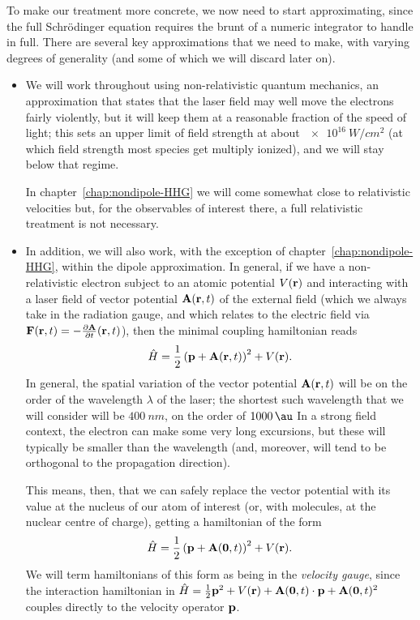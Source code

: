 To make our treatment more concrete, we now need to start approximating, since the full Schrödinger equation requires the brunt of a numeric integrator to handle in full. There are several key approximations that we need to make, with varying degrees of generality (and some of which we will discard later on).

\begin{itemize}
\item We will work throughout using non-relativistic quantum mechanics, an approximation that states that the laser field may well move the electrons fairly violently, but it will keep them at a reasonable fraction of the speed of light; this sets an upper limit of field strength at about $\SI{e16}{W/cm^2}$ (at which field strength most species get multiply ionized), and we will stay below that regime. 

In chapter~\ref{chap:nondipole-HHG} we will come somewhat close to relativistic velocities but, for the observables of interest there, a full relativistic treatment is not necessary.

\item In addition, we will also work, with the exception of chapter~\ref{chap:nondipole-HHG}, within the dipole approximation. In general, if we have a non-relativistic electron subject to an atomic potential $V(\vb{r})$ and interacting with a laser field of vector potential $\vb{A}(\vb{r},t)$ of the external field (which we always take in the radiation gauge, and which relates to the electric field via $\vb{F}(\vb{r},t)=-\frac{\partial \vb{A}}{\partial t}(\vb{r},t)$), then the minimal coupling hamiltonian reads
\begin{equation}
\hat H = \frac{1}{2} \left(\vb{p} +\vb{A}(\vb{r},t)\right)^2 + V(\vb{r}).
\end{equation}
In general, the spatial variation of the vector potential $\vb{A}(\vb{r},t)$ will be on the order of the wavelength $\lambda$ of the laser; the shortest such wavelength that we will consider will be $\SI{400}{nm}$, on the order of $\SI{1000}{\au}$ In a strong field context, the electron can make some very long excursions, but these will typically be smaller than the wavelength (and, moreover, will tend to be orthogonal to the propagation direction). 


This means, then, that we can safely replace the vector potential with its value at the nucleus of our atom of interest (or, with molecules, at the nuclear centre of charge), getting a hamiltonian of the form 
\begin{equation}
\hat H = \frac{1}{2} \left(\vb{p} +\vb{A}(\vb 0,t)\right)^2 + V(\vb{r}).
\label{e1-velocity-gauge-hamiltonian}
\end{equation}
We will term hamiltonians of this form as being in the \textit{velocity gauge}, since the interaction hamiltonian in $\hat H = \frac{1}{2} \vb{p}^2 + V(\vb{r}) + \vb{A}(\vb0,t)\cdot\vb{p} +\vb{A}(\vb0,t)^2$ couples directly to the velocity operator $\vb{p}$.


\end{itemize}
